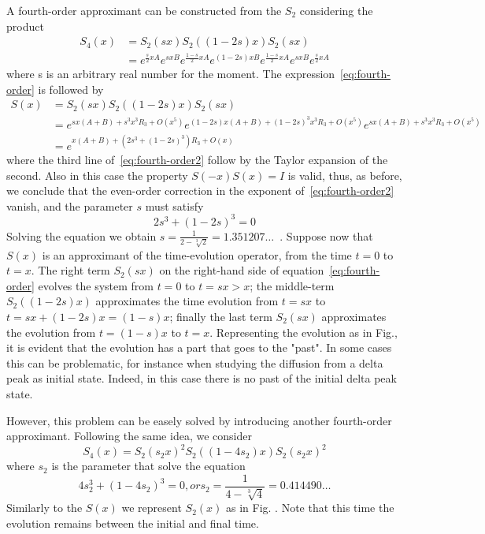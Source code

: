 A fourth-order approximant can be constructed from the $S_2$ considering the product
\begin{align} \label{eq:fourth-order}
S_4(x) &= S_2(sx) S_2((1-2s)x) S_2(sx) \\
&= e^{\frac{s}{2}xA} e^{sxB} e^{\frac{1-s}{2}xA} e^{(1-2s)xB} e^{\frac{1-s}{2}xA} e^{sxB} e^{\frac{s}{2}xA}
\end{align}
where s is an arbitrary real number for the moment. The expression~\eqref{eq:fourth-order} is followed by
\begin{align} \label{eq:fourth-order2}
S(x) &= S_2(sx) S_2((1-2s)x) S_2(sx)	 \\
&= e^{sx(A+B) + s^3x^3R_3 + O(x^5)} e^{(1-2s)x(A+B) + (1-2s)^3x^3R_3 + O(x^5)} e^{sx(A+B) + s^3x^3R_3 + O(x^5)} \\
&= e^{x(A+B)+(2s^3+(1-2s)^3)R_3+O(x)}
\end{align}
where the third line of~\eqref{eq:fourth-order2} follow by the Taylor expansion of the second. Also in this case the property $S(-x)S(x) = I$ is valid, thus, as before, we conclude that the even-order correction in the exponent of~\eqref{eq:fourth-order2} vanish, and the parameter $s$ must satisfy
\begin{equation}
2s^3 + (1-2s)^3 = 0
\end{equation}
Solving the equation we obtain $s = \frac{1}{2-\sqrt[3]{2}} = 1.351207\ldots$~. Suppose now that $S(x)$ is an approximant of the time-evolution operator, from the time $t=0$ to $t=x$. The right term $S_2(sx)$ on the right-hand side of equation~\eqref{eq:fourth-order} evolves the system from $t=0$ to $t=sx>x$; the middle-term $S_2((1-2s)x)$ approximates the time evolution from $t=sx$ to $t=sx + (1-2s)x = (1-s)x$; finally the last term $S_2(sx)$ approximates the evolution from $t=(1-s)x$ to $t=x$. Representing the evolution as in Fig., it is evident that the evolution has a part that goes to the "past". In some cases this can be problematic, for instance when studying the diffusion from a delta peak as initial state. Indeed, in this case there is no past of the initial delta peak state. 

However, this problem can be easely solved by introducing another fourth-order approximant. Following the same idea, we consider
\begin{equation}
S_4(x) = S_2(s_2x)^2 S_2((1-4s_2)x) S_2(s_2x)^2	
\end{equation}
where $s_2$ is the parameter that solve the equation
\begin{equation}
4s_2^3 + (1-4s_2)^3 = 0, or s_2 = \frac{1}{4 - \sqrt[3]{4}}=0.414490\ldots
\end{equation}
Similarly to the $S(x)$ we represent $S_2(x)$ as in Fig. . Note that this time the evolution remains between the initial and final time.

